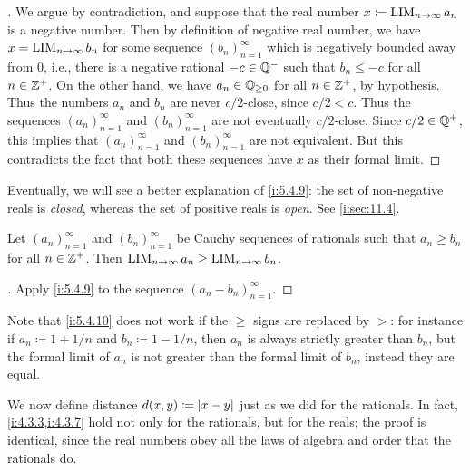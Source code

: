 \begin{proof}[]
  We argue by contradiction, and suppose that the real number \(x \coloneqq \operatorname*{LIM}_{n \to \infty} a_n\) is a negative number.
  Then by definition of negative real number, we have \(x = \operatorname*{LIM}_{n \to \infty} b_n\) for some sequence \((b_n)_{n = 1}^\infty\) which is negatively bounded away from \(0\), i.e., there is a negative rational \(-c \in \mathbb{Q}^-\) such that \(b_n \leq -c\) for all \(n \in \mathbb{Z}^+\).
  On the other hand, we have \(a_n \in \mathbb{Q}_{\geq 0}\) for all \(n \in \mathbb{Z}^+\), by hypothesis.
  Thus the numbers \(a_n\) and \(b_n\) are never \(c / 2\)-close, since \(c / 2 < c\).
  Thus the sequences \((a_n)_{n = 1}^{\infty}\) and \((b_n)_{n = 1}^{\infty}\) are not eventually \(c / 2\)-close.
  Since \(c / 2 \in \mathbb{Q}^+\), this implies that \((a_n)_{n = 1}^{\infty}\) and \((b_n)_{n = 1}^{\infty}\) are not equivalent.
  But this contradicts the fact that both these sequences have \(x\) as their formal limit.
\end{proof}

\begin{note}
  Eventually, we will see a better explanation of \cref{i:5.4.9}:
  the set of non-negative reals is \emph{closed}, whereas the set of positive reals is \emph{open}.
  See \cref{i:sec:11.4}.
\end{note}

\begin{cor}\label{i:5.4.10}
  Let \((a_n)_{n = 1}^{\infty}\) and \((b_n)_{n = 1}^{\infty}\) be Cauchy sequences of rationals such that \(a_n \geq b_n\) for all \(n \in \mathbb{Z}^+\).
  Then \(\operatorname*{LIM}_{n \to \infty} a_n \geq \operatorname*{LIM}_{n \to \infty} b_n\).
\end{cor}

\begin{proof}[]
  Apply \cref{i:5.4.9} to the sequence \((a_n - b_n)_{n = 1}^\infty\).
\end{proof}

\begin{rmk}\label{i:5.4.11}
  Note that \cref{i:5.4.10} does not work if the \(\geq\) signs are replaced by \(>\):
  for instance if \(a_n \coloneqq 1 + 1 / n\) and \(b_n \coloneqq 1 - 1 / n\), then \(a_n\) is always strictly greater than \(b_n\), but the formal limit of \(a_n\) is not greater than the formal limit of \(b_n\), instead they are equal.
\end{rmk}

\begin{ac}\label{i:ac:5.4.1}
  We now define distance \(d(x, y) \coloneqq \left\lvert x - y\right\rvert\) just as we did for the rationals.
  In fact, \cref{i:4.3.3,i:4.3.7} hold not only for the rationals, but for the reals;
  the proof is identical, since the real numbers obey all the laws of algebra and order that the rationals do.
\end{ac}

